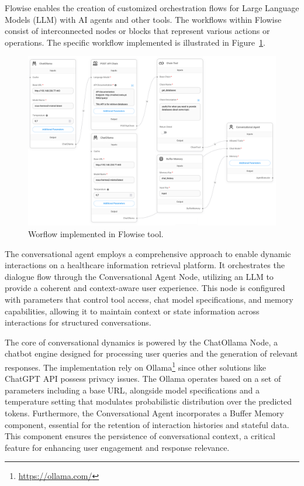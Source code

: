 Flowise enables the creation of customized orchestration flows for Large Language Models (LLM) with AI agents and other tools. The workflows within Flowise consist of interconnected nodes or blocks that represent various actions or operations. The specific workflow implemented is illustrated in Figure~\ref{fig_workflow}.

\begin{figure}[ht]
    \includegraphics[width=1\textwidth]{figs/chapter3/workflow.png}
    \centering
    \caption{Worflow implemented in Flowise tool.}
    \label{fig_workflow}
\end{figure}

The conversational agent employs a comprehensive approach to enable dynamic interactions on a healthcare information retrieval platform. It orchestrates the dialogue flow through the Conversational Agent Node, utilizing an LLM to provide a coherent and context-aware user experience. This node is configured with parameters that control tool access, chat model specifications, and memory capabilities, allowing it to maintain context or state information across interactions for structured conversations.

The core of conversational dynamics is powered by the ChatOllama Node, a chatbot engine designed for processing user queries and the generation of relevant responses. The implementation rely on Ollama\footnote{\url{https://ollama.com/}} since other solutions like ChatGPT API possess privacy issues. The Ollama operates based on a set of parameters including a base URL, alongside model specifications and a temperature setting that modulates probabilistic distribution over the predicted tokens. Furthermore, the Conversational Agent incorporates a Buffer Memory component, essential for the retention of interaction histories and stateful data. This component ensures the persistence of conversational context, a critical feature for enhancing user engagement and response relevance.

